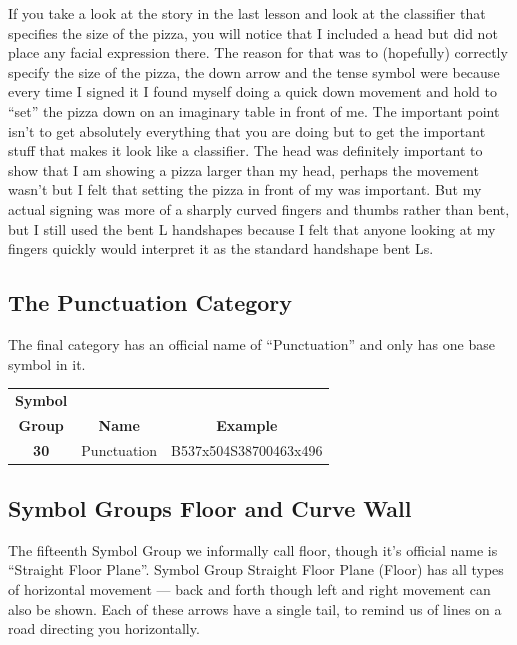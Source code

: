 \documentclass{article}
\begin{document}
If you take a look at the story in the last lesson and look at the classifier that specifies the size of the pizza, you will notice that I included a head but did not place any facial expression there.
The reason for that was to (hopefully) correctly specify the size of the pizza, the down arrow and the tense symbol were because every time I signed it I found myself doing a quick down movement and hold to ``set'' the pizza down on an imaginary table in front of me.
The important point isn't to get absolutely everything that you are doing but to get the important stuff that makes it look like a classifier.
The head was definitely important to show that I am showing a pizza larger than my head, perhaps the movement wasn't but I felt that setting the pizza in front of my was important.
But my actual signing was more of a sharply curved fingers and thumbs rather than bent, but I still used the bent L handshapes because I felt that anyone looking at my fingers quickly would interpret it as the standard handshape bent Ls.

\subsection{The Punctuation Category}

The final category has an official name of ``Punctuation'' and only has one base symbol in it.

\begin{center}
\begin{tabular}{ccc}
\textbf{Symbol}\\
\textbf{Group}&\textbf{Name}&\textbf{Example}\\
\textbf{30}&Punctuation&B537x504S38700463x496\\
\end{tabular}
\end{center}

\subsection{Symbol Groups Floor and Curve Wall}

The fifteenth Symbol Group we informally call floor, though it's official name is ``Straight Floor Plane''.
Symbol Group Straight Floor Plane (Floor) has all types of horizontal movement --- back and forth though left and right movement can also be shown.
Each of these arrows have a single tail, to remind us of lines on a road directing you horizontally.
\end{document}
